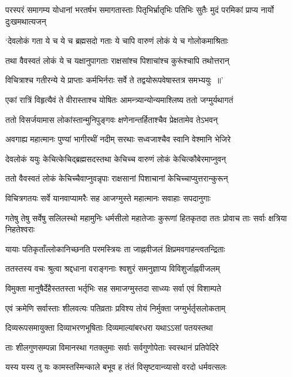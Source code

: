 \threelineshloka
{परस्परं समागम्य योधानां भरतर्षभ}
{समागतास्ताः पितृभिर्भ्रातृभिः पतिभिः सुतैः}
{मुदं परमिकां प्राप्य नार्यो दुःखमथात्यजन्}


\twolineshloka
{`देवलोकं गता ये च ये च ब्रह्मसदो गताः}
{ये चापि वारुणं लोकं ये च गोलोकमाश्रिताः}


\twolineshloka
{तथा वैवस्वतं लोकं ये च यक्षानुपागताः}
{राक्षसांश्च पिशाचांश्च कुरूंश्चापि तथोत्तरान्}


\twolineshloka
{विचित्राश्च गतीरन्ये ये प्राप्ताः कर्मभिर्नराः}
{सर्वे ते तद्वयोरूपवेषास्तत्र समभ्ययुः ॥'}


\twolineshloka
{एकां रात्रिं विहृत्यैवं ते वीरास्ताश्च योषितः}
{आमन्त्र्यान्योन्यमाश्लिष्य ततो जग्मुर्यथागतं}


\twolineshloka
{ततो विसर्जयामास लोकांस्तान्मुनिपुङ्गवः}
{क्षणेनान्तर्हिताश्चैव प्रेक्षतामेव तेऽभवन्}


\twolineshloka
{अवगाह्य महात्मानः पुण्यां भागीरथीं नदीम्}
{सरथाः सध्वजाश्चैव स्वानि वेश्मानि भेजिरे}


\twolineshloka
{देवलोकं ययुः केचित्केचिद्ब्रह्मसदस्तथा}
{केचिच्च वारुणं लोकं केचित्कौबेरमाप्नुवन्}


\twolineshloka
{ततो वैवस्वतं लोकं केचिच्चैवाप्नुवन्नृपाः}
{राक्षसानां पिशाचानां केचिच्चाप्युत्तरान्कुरून्}


\twolineshloka
{विचित्रगतयः सर्वे यानवाप्यामरैः सह}
{आजग्मुस्ते महात्मानः सवाहाः सपदानुगाः}


\fourlineindentedshloka
{गतेषु तेषु सर्वेषु सलिलस्थो महामुनिः}
{धर्मसीलो महातेजाः कुरूणां हितकृतदा}
{ततः प्रोवाच ताः सर्वाः क्षत्रिया निहतेश्वराः}
{}


\twolineshloka
{यायाः पतिकृताँल्लोकानिच्छनति परमस्त्रियः}
{ता जाह्नवीजलं क्षिप्रमवगाहन्त्वतन्द्रिताः}


\twolineshloka
{ततस्तस्य वचः श्रुत्वा श्रद्दधाना वराङ्गनाः}
{श्वशुरं समनुज्ञाप्य विविशुर्जाह्नवीजलम्}


\twolineshloka
{विमुक्ता मानुषैर्देहैस्ततस्ता भर्तृभिः सह}
{समाजग्मुस्तदा साध्व्यः सर्वा एवं विशाम्पते}


\twolineshloka
{एवं क्रमेणि सर्वास्ताः शीलवत्यः पतिव्रताः}
{प्रविश्य तोयं निर्मुक्ता जग्मुर्भर्तृसलोकताम्}


\twolineshloka
{दिव्यरूपसमायुक्ता दिव्याभरणभूषिताः}
{दिव्यमाल्यांबरधरा यथाऽऽसां पतयस्तथा}


\twolineshloka
{ताः शीलगुणसम्पन्ना विमानस्था गतक्लुमाः}
{सर्वाः सर्वगुणोपेताः स्वस्थानं प्रतिपेदिरे}


\twolineshloka
{यस्य यस्य तु यः कामस्तस्मिन्काले बभूव ह}
{तंतं विसृष्टवान्व्यासो वरदो धर्मवत्सलः}


